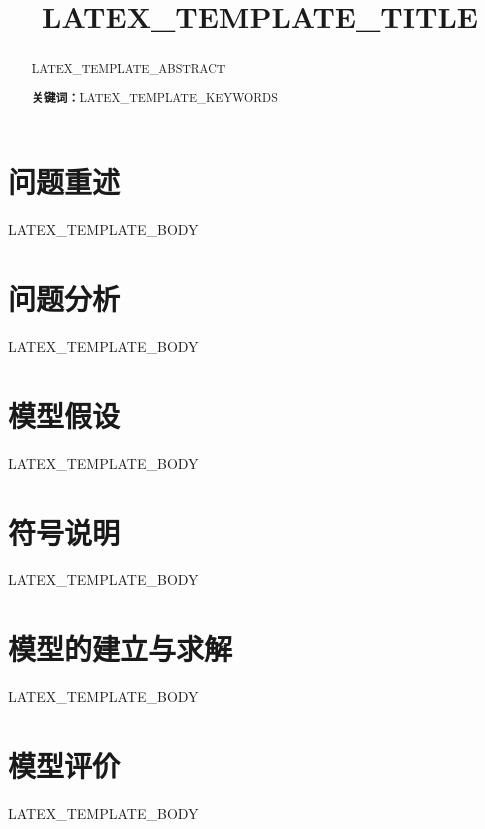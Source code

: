 \documentclass[UTF8,12pt,a4paper]{ctexart}
\title{LATEX_TEMPLATE_TITLE}
\author{}
\date{}
\newcommand{\keywords}[1]{\par\noindent\textbf{关键词：}#1}
\begin{document}
\maketitle

\begin{abstract}
LATEX_TEMPLATE_ABSTRACT
\keywords{LATEX_TEMPLATE_KEYWORDS}
\end{abstract}

\section{问题重述}
LATEX_TEMPLATE_BODY

\section{问题分析}
LATEX_TEMPLATE_BODY

\section{模型假设}
LATEX_TEMPLATE_BODY

\section{符号说明}
LATEX_TEMPLATE_BODY

\section{模型的建立与求解}
LATEX_TEMPLATE_BODY

\section{模型评价}
LATEX_TEMPLATE_BODY




\end{document}
